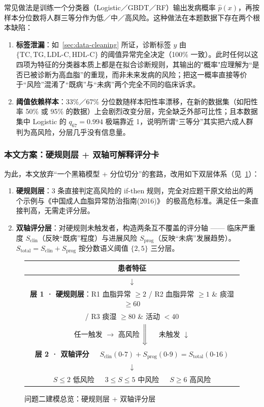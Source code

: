 \documentclass{MathorCupmodeling}
\providecommand{\tightlist}{%
  \setlength{\itemsep}{0pt}\setlength{\parskip}{0pt}}
\begin{document}
常见做法是训练一个分类器（Logistic／GBDT／RF）输出发病概率 $\hat p(x)$，再按样本分位数将人群三等分作为低／中／高风险。这种做法在本题数据下存在两个根本缺陷：

\begin{enumerate}
\def\labelenumi{(\arabic{enumi})}
\tightlist
\item \textbf{标签泄漏}：如~\cref{sec:data-cleaning} 所证，诊断标签 $y$ 由 $\{\text{TC}, \text{TG}, \text{LDL-C}, \text{HDL-C}\}$ 的阈值异常完全决定（100\% 一致）。此时任何以这四项为特征的分类器本质上都是在拟合诊断规则，其输出的"概率"应理解为``是否已被诊断为高血脂''的重现，而非未来发病的风险；把这一概率直接等价于``风险''混淆了``既病''与``未病''两个完全不同的临床诉求。
\item \textbf{阈值依赖样本}：33\%／67\% 分位数随样本阳性率漂移，在新的数据集（如阳性率 50\% 或 95\% 的数据）上会剧烈改变分层，完全缺乏外部可比性；且本数据集中 Logistic 的 $q_{67}=0.994$ 极端靠近 1，说明所谓``三等分''其实把六成人群判为高风险，分层几乎没有信息量。
\end{enumerate}

\subsubsection{本文方案：硬规则层 + 双轴可解释评分卡}

为此，本文放弃``一个黑箱模型 + 分位切分''的套路，改用如下双层体系（见~\cref{fig:q2-flow}）：

\begin{enumerate}
\def\labelenumi{\textbf{层~\arabic{enumi}.}}
\item \textbf{硬规则层}：3 条直接判定高风险的 if-then 规则，完全对应题干原文给出的两个示例与《中国成人血脂异常防治指南(2016)》\cite{cn-dyslipidemia-2016} 的极高危标准。满足任一条直接判高，无需走评分层。
\item \textbf{双轴评分层}：对硬规则未触发者，构造两条互不覆盖的评分轴 —— 临床严重度 $S_{\text{clin}}$（反映``既病''程度）与进展风险 $S_{\text{prog}}$（反映``未病''发展趋势）。$S_{\text{total}}=S_{\text{clin}}+S_{\text{prog}}$ 按分数语义阈值 $\{2, 5\}$ 三分层。
\end{enumerate}

\begin{figure}[H]
\centering
\begin{tabular}{|c|}
\hline
患者特征 \\
\hline
$\downarrow$ \\
\hline
\textbf{层 1 · 硬规则层}：R1 血脂异常 $\ge 2$ / R2 血脂异常 $\ge 1$ \& 痰湿 $\ge 60$ \\
 / R3 痰湿 $\ge 80$ \& 活动 $< 40$ \\
\hline
任一触发 $\to$ 高风险 $\Bigg\Downarrow$~~~未触发 $\downarrow$ \\
\hline
\textbf{层 2 · 双轴评分}~~~$S_{\text{clin}}(0\text{-}7) + S_{\text{prog}}(0\text{-}9) = S_{\text{total}}(0\text{-}16)$ \\
\hline
$\downarrow$ \\
\hline
$S \le 2$ 低风险~~~$3\le S\le 5$ 中风险~~~$S\ge 6$ 高风险 \\
\hline
\end{tabular}
\caption{问题二建模总览：硬规则层 + 双轴评分层}\label{fig:q2-flow}
\end{figure}
\end{document}
